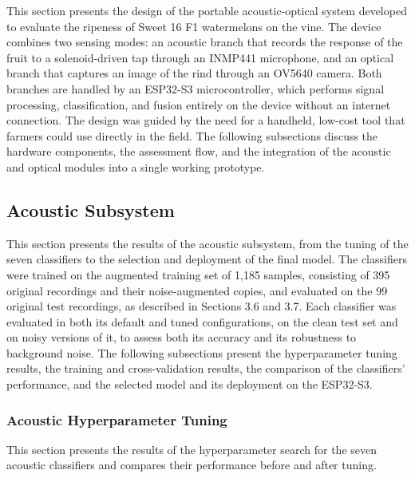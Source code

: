 \begin{thesisprose}
This section presents the design of the portable acoustic-optical system developed to evaluate the ripeness of Sweet 16 F1 watermelons on the vine. The device combines two sensing modes: an acoustic branch that records the response of the fruit to a solenoid-driven tap through an INMP441 microphone, and an optical branch that captures an image of the rind through an OV5640 camera. Both branches are handled by an ESP32-S3 microcontroller, which performs signal processing, classification, and fusion entirely on the device without an internet connection. The design was guided by the need for a handheld, low-cost tool that farmers could use directly in the field. The following subsections discuss the hardware components, the assessment flow, and the integration of the acoustic and optical modules into a single working prototype.

\subsection{Acoustic Subsystem}

This section presents the results of the acoustic subsystem, from the tuning of the seven classifiers to the selection and deployment of the final model. The classifiers were trained on the augmented training set of 1,185 samples, consisting of 395 original recordings and their noise-augmented copies, and evaluated on the 99 original test recordings, as described in Sections 3.6 and 3.7. Each classifier was evaluated in both its default and tuned configurations, on the clean test set and on noisy versions of it, to assess both its accuracy and its robustness to background noise. The following subsections present the hyperparameter tuning results, the training and cross-validation results, the comparison of the classifiers’ performance, and the selected model and its deployment on the ESP32-S3.

\subsubsection{Acoustic Hyperparameter Tuning}

This section presents the results of the hyperparameter search for the seven acoustic classifiers and compares their performance before and after tuning.


\end{thesisprose}
